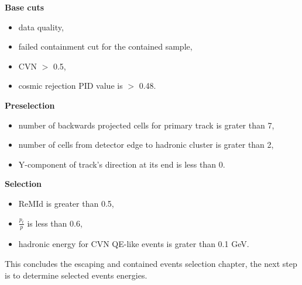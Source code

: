 \textbf{Base cuts}
\begin{itemize}
\item data quality,
\item failed containment cut for the contained sample,
\item CVN $>$ 0.5,
\item cosmic rejection PID value is $>$ 0.48.
\end{itemize}

\textbf{Preselection}
\begin{itemize}
\item number of backwards projected cells for primary track is grater than 7,
\item number of cells from detector edge to hadronic cluster is grater than 2,
\item Y-component of track's direction at its end is less than 0.
\end{itemize}

\textbf{Selection}
\begin{itemize}
\item ReMId is greater than 0.5,
\item $\frac{p_t}{p}$ is less than 0.6,
\item hadronic energy for CVN QE-like events is grater than 0.1 GeV.
\end{itemize}

This concludes the escaping and contained events selection chapter, the next step is to determine selected events energies.
